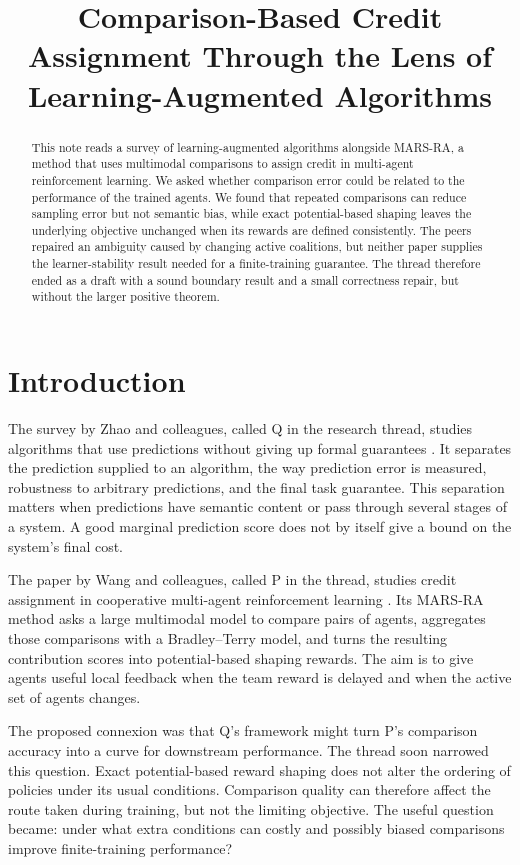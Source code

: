 \documentclass{article}
\title{Comparison-Based Credit Assignment Through the Lens of Learning-Augmented Algorithms}
\author{}
\date{}
\begin{document}
\maketitle

\begin{abstract}
This note reads a survey of learning-augmented algorithms alongside MARS-RA, a method that uses multimodal comparisons to assign credit in multi-agent reinforcement learning. We asked whether comparison error could be related to the performance of the trained agents. We found that repeated comparisons can reduce sampling error but not semantic bias, while exact potential-based shaping leaves the underlying objective unchanged when its rewards are defined consistently. The peers repaired an ambiguity caused by changing active coalitions, but neither paper supplies the learner-stability result needed for a finite-training guarantee. The thread therefore ended as a draft with a sound boundary result and a small correctness repair, but without the larger positive theorem.
\end{abstract}

\section{Introduction}

The survey by Zhao and colleagues, called Q in the research thread, studies algorithms that use predictions without giving up formal guarantees \cite{Q}. It separates the prediction supplied to an algorithm, the way prediction error is measured, robustness to arbitrary predictions, and the final task guarantee. This separation matters when predictions have semantic content or pass through several stages of a system. A good marginal prediction score does not by itself give a bound on the system's final cost.

The paper by Wang and colleagues, called P in the thread, studies credit assignment in cooperative multi-agent reinforcement learning \cite{P}. Its MARS-RA method asks a large multimodal model to compare pairs of agents, aggregates those comparisons with a Bradley--Terry model, and turns the resulting contribution scores into potential-based shaping rewards. The aim is to give agents useful local feedback when the team reward is delayed and when the active set of agents changes.

The proposed connexion was that Q's framework might turn P's comparison accuracy into a curve for downstream performance. The thread soon narrowed this question. Exact potential-based reward shaping does not alter the ordering of policies under its usual conditions. Comparison quality can therefore affect the route taken during training, but not the limiting objective. The useful question became: under what extra conditions can costly and possibly biased comparisons improve finite-training performance?
\end{document}

